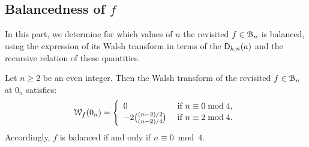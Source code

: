 \documentclass[11pt]{llncs}
\begin{document}
\subsection{Balancedness of $f$}\label{sec:balancedness}

In this part, we determine for which values of $n$ the revisited \hwbf{} $f\in\BN$ is balanced, using the expression of its Walsh transform in terms of the $\Dnka{n}{k}{a}$ and the recursive relation of these quantities.

\begin{theorem}\label{th:bal}
	Let $n\geq 2$ be an even integer.
	Then the Walsh transform of the revisited \hwbf{} $f\in\BN$ at $0_n$ satisfies:
	\[
		\wt{f}(0_n)=\left\{\begin{array}{ll}
			0&\text{ if }n\equiv 0\bmod 4,\\
			-2\binom{(n-2)/2}{(n-2)/4}&\text{ if }n\equiv 2\bmod 4.\\
		\end{array}\right.
	\]
	Accordingly, $f$ is balanced if and only if $n \equiv 0\bmod 4$.
\end{theorem}
\end{document}

